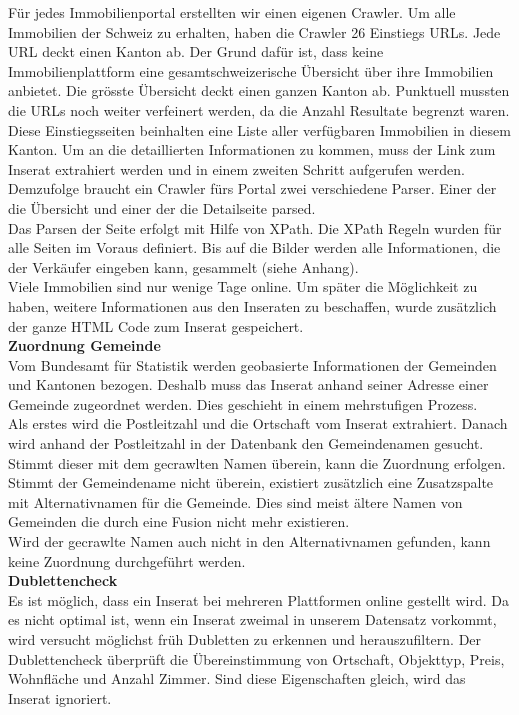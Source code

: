 %
Für jedes Immobilienportal erstellten wir einen eigenen Crawler. Um alle Immobilien der Schweiz zu erhalten, haben die Crawler 26 Einstiegs URLs. Jede URL deckt einen Kanton ab. Der Grund dafür ist, dass keine Immobilienplattform eine gesamtschweizerische Übersicht über ihre Immobilien anbietet. Die grösste Übersicht deckt einen ganzen Kanton ab. Punktuell mussten die URLs noch weiter verfeinert werden, da die Anzahl Resultate begrenzt waren.\\
Diese Einstiegsseiten beinhalten eine Liste aller verfügbaren Immobilien in diesem Kanton. Um an die detaillierten Informationen zu kommen, muss der Link zum Inserat extrahiert werden und in einem zweiten Schritt aufgerufen werden.
Demzufolge braucht ein Crawler fürs Portal zwei verschiedene Parser. Einer der die Übersicht und einer der die Detailseite parsed.\\[2ex]
%
Das Parsen der Seite erfolgt mit Hilfe von XPath. Die XPath Regeln wurden für alle Seiten im Voraus definiert. Bis auf die Bilder werden alle Informationen, die der Verkäufer eingeben kann, gesammelt (siehe Anhang).\\
Viele Immobilien sind nur wenige Tage online. Um später die Möglichkeit zu haben, weitere Informationen aus den Inseraten zu beschaffen, wurde zusätzlich der ganze HTML Code zum Inserat gespeichert.\\[2ex] 
%
\textbf{Zuordnung Gemeinde}\\
Vom Bundesamt für Statistik werden geobasierte Informationen der Gemeinden und Kantonen bezogen. Deshalb muss das Inserat anhand seiner Adresse einer Gemeinde zugeordnet werden. Dies geschieht in einem mehrstufigen Prozess.\\
Als erstes wird die Postleitzahl und die Ortschaft vom Inserat extrahiert. Danach wird anhand der Postleitzahl in der Datenbank den Gemeindenamen gesucht. Stimmt dieser mit dem gecrawlten Namen überein, kann die Zuordnung erfolgen.\\
Stimmt der Gemeindename nicht überein, existiert zusätzlich eine Zusatzspalte mit Alternativnamen für die Gemeinde.  Dies sind meist ältere Namen von Gemeinden die durch eine Fusion nicht mehr existieren.\\
Wird der gecrawlte Namen auch nicht in den Alternativnamen gefunden, kann keine Zuordnung durchgeführt werden.\\[2ex]
%
\textbf{Dublettencheck}\\
Es ist möglich, dass ein Inserat bei mehreren Plattformen online gestellt wird. Da es nicht optimal ist, wenn ein Inserat zweimal in unserem Datensatz vorkommt, wird versucht möglichst früh Dubletten zu erkennen und herauszufiltern. Der Dublettencheck überprüft die Übereinstimmung von Ortschaft, Objekttyp, Preis, Wohnfläche und Anzahl Zimmer. Sind diese Eigenschaften gleich, wird das Inserat ignoriert.\\[2ex]
